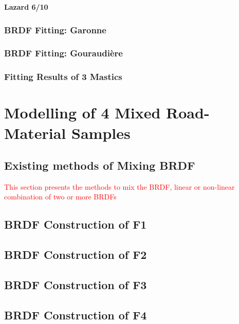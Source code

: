 \textbf{Lazard 6/10}
\subsubsection{BRDF Fitting: Garonne}

\subsubsection{BRDF Fitting: Gouraudière}


\subsubsection{Fitting Results of 3 Mastics}


\section{Modelling of 4 Mixed Road-Material Samples}

\subsection{Existing methods of Mixing BRDF}

\textcolor{red}{This section presents the methods to mix the BRDF, linear or non-linear combination of two or more BRDFs}

\subsection{BRDF Construction of F1}


\subsection{BRDF Construction of F2}

\subsection{BRDF Construction of F3}

\subsection{BRDF Construction of F4}